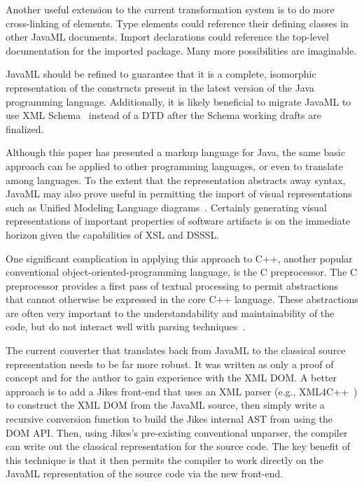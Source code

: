 \documentclass{article}
\begin{document}
\begin{multicols}{2}
Another useful extension to the current transformation system is to do
more cross-linking of elements.  Type elements could reference their
defining classes in other JavaML documents.  Import declarations could
reference the top-level documentation for the imported package.  Many
more possibilities are imaginable.

JavaML should be refined to guarantee that it is a complete, isomorphic
representation of the constructs present in the latest version of the
Java programming language.  Additionally, it is likely beneficial to
migrate JavaML to use XML Schema~\cite{XMLSchema1,XMLSchema2} instead of
a DTD after the Schema working drafts are finalized.

Although this paper has presented a markup language for Java, the same
basic approach can be applied to other programming languages, or even to
translate among languages.  To the extent that the representation
abstracts away syntax, JavaML may also prove useful in permitting the
import of visual representations such as Unified Modeling Language
diagrams~\cite{UMLNutshell,XMI}.  Certainly generating visual
representations of important properties of software artifacts is on the
immediate horizon given the capabilities of XSL and DSSSL.

One significant complication in applying this approach to C++, another
popular conventional object-oriented-programming language, is the C
preprocessor.  The C preprocessor provides a first pass of textual
processing to permit abstractions that cannot otherwise be expressed in
the core C++ language.  These abstractions are often very important to
the understandability and maintainability of the code, but do not
interact well with parsing techniques~\cite{ErnstBadrosNotkin00,Badros00-spe}.

The current converter that translates back from JavaML to the classical
source representation needs to be far more robust.  It was written as
only a proof of concept and for the author to gain experience with the
XML DOM.  A better approach is to add a Jikes front-end that uses an XML
parser (e.g., XML4C++~\cite{XML4C++}) to construct the XML DOM from the
JavaML source, then simply write a recursive conversion function to
build the Jikes internal AST from using the DOM API.  Then, using
Jikes's pre-existing conventional unparser, the compiler can write out
the classical representation for the source code.  The key benefit of
this technique is that it then permits the compiler to work directly on
the JavaML representation of the source code via the new front-end.


\end{multicols}
\end{document}
